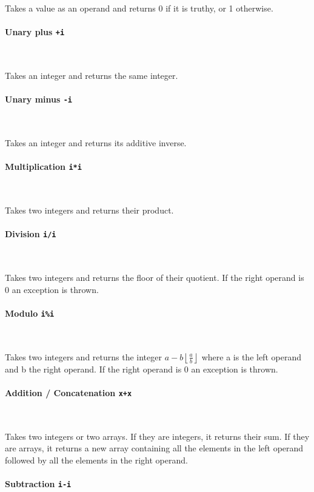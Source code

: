 Takes a value as an operand and returns 0 if it is truthy, or 1 otherwise.

\paragraph{Unary plus \quad \texttt{+i}} \

Takes an integer and returns the same integer.

\paragraph{Unary minus \quad \texttt{-i}} \

Takes an integer and returns its additive inverse.

\paragraph{Multiplication \quad \texttt{i*i}} \

Takes two integers and returns their product.

\paragraph{Division \quad \texttt{i/i}} \

Takes two integers and returns the floor of their quotient. If the right operand is 0 an exception is thrown.

\paragraph{Modulo \quad \texttt{i\%i}} \

Takes two integers and returns the integer $ a - b \left\lfloor \frac{a}{b} \right\rfloor $ where a is the left operand and b the right operand. If the right operand is 0 an exception is thrown.

\paragraph{Addition / Concatenation \quad \texttt{x+x}} \

Takes two integers or two arrays. If they are integers, it returns their sum. If they are arrays, it returns a new array containing all the elements in the left operand followed by all the elements in the right operand.

\paragraph{Subtraction \quad \texttt{i-i}} \

